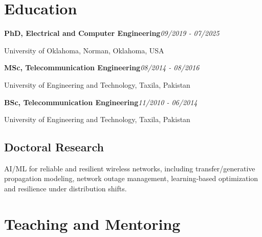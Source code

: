 \documentclass[8pt,letterpaper]{extarticle}
\newcommand{\entry}[2]{\Needspace{4\baselineskip}\textbf{#1}\hfill\textit{#2}\par}
\begin{document}
\section{Education}
\entry{PhD, Electrical and Computer Engineering}{09/2019 - 07/2025}
University of Oklahoma, Norman, Oklahoma, USA\par
\entry{MSc, Telecommunication Engineering}{08/2014 - 08/2016}
University of Engineering and Technology, Taxila, Pakistan\par
\entry{BSc, Telecommunication Engineering}{11/2010 - 06/2014}
University of Engineering and Technology, Taxila, Pakistan\par
{}
\subsection{Doctoral Research}
AI/ML for reliable and resilient wireless networks, including transfer/generative propagation modeling, network outage management, learning-based optimization and resilience under distribution shifts.\par
{}
\section{Teaching and Mentoring}
\end{document}
